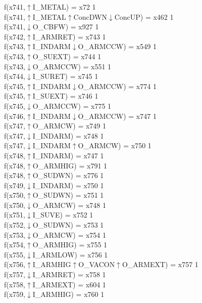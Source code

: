 f(x741,$\uparrow$I\_METAL) = x72 {1} \\
f(x741,$\uparrow$I\_METAL$\uparrow$ConcDWN$\downarrow$ConcUP) = x462 {1} \\
f(x741,$\downarrow$O\_CBFW) = x927 {1} \\
f(x742,$\uparrow$I\_ARMRET) = x743 {1} \\
f(x743,$\uparrow$I\_INDARM$\downarrow$O\_ARMCCW) = x549 {1} \\
f(x743,$\uparrow$O\_SUEXT) = x744 {1} \\
f(x743,$\downarrow$O\_ARMCCW) = x551 {1} \\
f(x744,$\downarrow$I\_SURET) = x745 {1} \\
f(x745,$\uparrow$I\_INDARM$\downarrow$O\_ARMCCW) = x774 {1} \\
f(x745,$\uparrow$I\_SUEXT) = x746 {1} \\
f(x745,$\downarrow$O\_ARMCCW) = x775 {1} \\
f(x746,$\uparrow$I\_INDARM$\downarrow$O\_ARMCCW) = x747 {1} \\
f(x747,$\uparrow$O\_ARMCW) = x749 {1} \\
f(x747,$\downarrow$I\_INDARM) = x748 {1} \\
f(x747,$\downarrow$I\_INDARM$\uparrow$O\_ARMCW) = x750 {1} \\
f(x748,$\uparrow$I\_INDARM) = x747 {1} \\
f(x748,$\uparrow$O\_ARMHIG) = x791 {1} \\
f(x748,$\uparrow$O\_SUDWN) = x776 {1} \\
f(x749,$\downarrow$I\_INDARM) = x750 {1} \\
f(x750,$\uparrow$O\_SUDWN) = x751 {1} \\
f(x750,$\downarrow$O\_ARMCW) = x748 {1} \\
f(x751,$\downarrow$I\_SUVE) = x752 {1} \\
f(x752,$\downarrow$O\_SUDWN) = x753 {1} \\
f(x753,$\downarrow$O\_ARMCW) = x754 {1} \\
f(x754,$\uparrow$O\_ARMHIG) = x755 {1} \\
f(x755,$\downarrow$I\_ARMLOW) = x756 {1} \\
f(x756,$\uparrow$I\_ARMHIG$\uparrow$O\_VACON$\uparrow$O\_ARMEXT) = x757 {1} \\
f(x757,$\downarrow$I\_ARMRET) = x758 {1} \\
f(x758,$\uparrow$I\_ARMEXT) = x604 {1} \\
f(x759,$\downarrow$I\_ARMHIG) = x760 {1} \\

